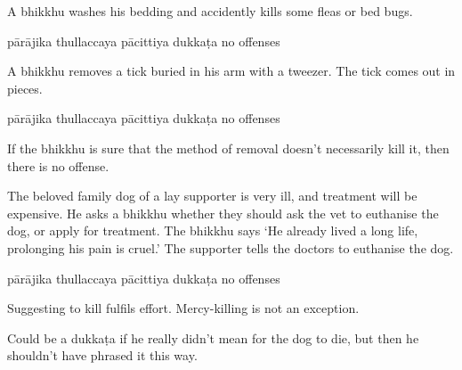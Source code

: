 \begin{exam}{\autoExamName}
\begin{problem*}
\begin{parts}
  \bigskip

  \item A bhikkhu washes his bedding and accidently kills some fleas or bed bugs.

  \bigskip

  \begin{answers}{5}
    \bChoices
     pārājika\eAns
     thullaccaya\eAns
     pācittiya\eAns
     dukkaṭa\eAns
     no offenses\eAns
    \eChoices
  \end{answers}

  \bigskip

  \item A bhikkhu removes a tick buried in his arm with a tweezer. The tick comes out in pieces.

  \bigskip

  \begin{answers}{5}
    \bChoices
     pārājika\eAns
     thullaccaya\eAns
     pācittiya\eAns
     dukkaṭa\eAns
     no offenses\eAns
    \eChoices
  \end{answers}

  \begin{solution}
    If the bhikkhu is sure that the method of removal doesn't necessarily kill
    it, then there is no offense.
  \end{solution}

  \bigskip

  \item The beloved family dog of a lay supporter is very ill, and treatment will
    be expensive. He asks a bhikkhu whether they should ask the vet to euthanise
    the dog, or apply for treatment. The bhikkhu says `He already lived a long
    life, prolonging his pain is cruel.' The supporter tells the doctors to
    euthanise the dog.

  \bigskip

  \begin{answers}{5}
    \bChoices
     pārājika\eAns
     thullaccaya\eAns
     pācittiya\eAns
     dukkaṭa\eAns
     no offenses\eAns
    \eChoices
  \end{answers}

  \begin{solution}
    Suggesting to kill fulfils effort. Mercy-killing is not an exception.

    Could be a dukkaṭa if he really didn't mean for the dog to die, but then he
    shouldn't have phrased it this way.
  \end{solution}


\end{parts}
\end{problem*}
\end{exam}

